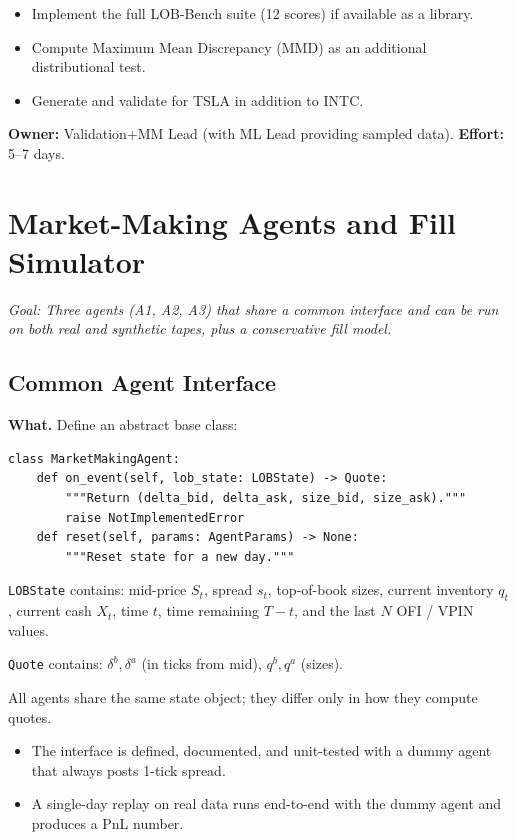 \documentclass[11pt,a4paper]{article}
\begin{document}
\begin{deepbox}
  \begin{itemize}[nosep]
    \item Implement the full LOB-Bench suite (12 scores) if available as a library.
    \item Compute Maximum Mean Discrepancy (MMD) as an additional distributional test.
    \item Generate and validate for TSLA in addition to INTC.
  \end{itemize}
\end{deepbox}

\textbf{Owner:} Validation+MM Lead (with ML Lead providing sampled data). \quad \textbf{Effort:} 5--7 days.


\section{Market-Making Agents and Fill Simulator}

\textit{Goal: Three agents (A1, A2, A3) that share a common interface and can be run on both real and synthetic tapes, plus a conservative fill model.}

\subsection{Common Agent Interface}

\textbf{What.}
Define an abstract base class:

\begin{verbatim}
class MarketMakingAgent:
    def on_event(self, lob_state: LOBState) -> Quote:
        """Return (delta_bid, delta_ask, size_bid, size_ask)."""
        raise NotImplementedError
    def reset(self, params: AgentParams) -> None:
        """Reset state for a new day."""
\end{verbatim}

\texttt{LOBState} contains: mid-price $S_t$, spread $s_t$, top-of-book sizes, current inventory $q_t$, current cash $X_t$, time $t$, time remaining $T - t$, and the last $N$ OFI / VPIN values.

\texttt{Quote} contains: $\delta^b, \delta^a$ (in ticks from mid), $q^b, q^a$ (sizes).

All agents share the same state object; they differ only in how they compute quotes.

\begin{successbox}
  \begin{itemize}[nosep]
    \item The interface is defined, documented, and unit-tested with a dummy agent that always posts 1-tick spread.
    \item A single-day replay on real data runs end-to-end with the dummy agent and produces a PnL number.
  \end{itemize}
\end{successbox}
\end{document}

